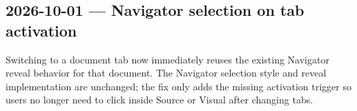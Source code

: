 \documentclass[a4paper]{article}
\title{}
\date{}
\author{Mohammad Rahmani}
\begin{document}
   \maketitle

   \begin{preview}
      \section*{2026-10-01 --- Navigator selection on tab activation}
      Switching to a document tab now immediately reuses the existing Navigator reveal behavior for that document. The Navigator selection style and reveal implementation are unchanged; the fix only adds the missing activation trigger so users no longer need to click inside Source or Visual after changing tabs.
   \end{preview}

   
   
\end{document}
